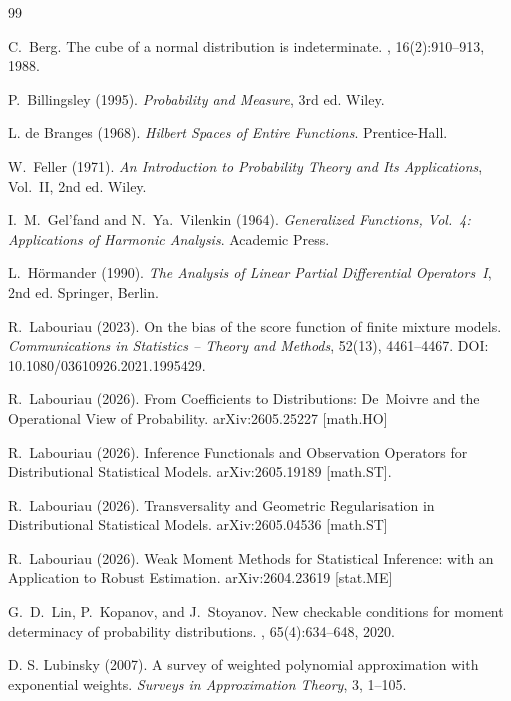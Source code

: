 \documentclass[12pt]{article}
\theoremstyle{definition}
\begin{document}
\begin{thebibliography}{99}

C.~Berg.
\newblock The cube of a normal distribution is indeterminate.
, 16(2):910--913, 1988.

P.~Billingsley (1995).
\textit{Probability and Measure}, 3rd ed.
Wiley.

L. de Branges (1968).
\textit{Hilbert Spaces of Entire Functions}.
Prentice-Hall.

W.~Feller (1971).
\textit{An Introduction to Probability Theory and Its Applications}, Vol.~II, 2nd ed.
Wiley.

I.~M.~Gel'fand and N.~Ya.~Vilenkin (1964).
\textit{Generalized Functions, Vol.~4: Applications of Harmonic Analysis}.
Academic Press.

L.~H\"ormander (1990).
\textit{The Analysis of Linear Partial Differential Operators~I},
2nd ed. Springer, Berlin.

R.~Labouriau (2023).
On the bias of the score function of finite mixture models.
\textit{Communications in Statistics -- Theory and Methods}, 52(13), 4461--4467.
DOI: 10.1080/03610926.2021.1995429.

R.~Labouriau (2026).
From Coefficients to Distributions:
De~Moivre and the Operational View of Probability.
arXiv:2605.25227 [math.HO]

R.~Labouriau (2026).
Inference  Functionals and Observation Operators for Distributional
Statistical Models.
arXiv:2605.19189 [math.ST].

R.~Labouriau (2026).
Transversality and Geometric Regularisation in Distributional
Statistical Models.
arXiv:2605.04536 [math.ST]

R.~Labouriau (2026).
Weak Moment Methods for Statistical Inference:
with an Application to Robust Estimation.
arXiv:2604.23619 [stat.ME]

G.~D.~Lin, P.~Kopanov, and J.~Stoyanov.
\newblock New checkable conditions for moment determinacy of probability distributions.
, 65(4):634--648, 2020.

D. S. Lubinsky (2007).
A survey of weighted polynomial approximation with exponential weights.
\textit{Surveys in Approximation Theory}, 3, 1--105.


\end{thebibliography}
\end{document}
